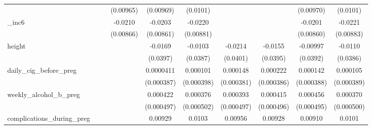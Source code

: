 \begin{table}[htbp]
\begin{tabular}{l*{9}{c}}
            &                     &                     &   (0.00965)         &   (0.00969)         &    (0.0101)         &                     &                     &   (0.00970)         &    (0.0101)         \\
[1em]
\_inc6       &                     &                     &     -0.0210\sym{**} &     -0.0203\sym{**} &     -0.0220\sym{**} &                     &                     &     -0.0201\sym{**} &     -0.0221\sym{**} \\
            &                     &                     &   (0.00866)         &   (0.00861)         &   (0.00881)         &                     &                     &   (0.00860)         &   (0.00883)         \\
[1em]
height      &                     &                     &                     &     -0.0169         &     -0.0103         &     -0.0214         &     -0.0155         &    -0.00997         &     -0.0110         \\
            &                     &                     &                     &    (0.0397)         &    (0.0387)         &    (0.0401)         &    (0.0395)         &    (0.0392)         &    (0.0386)         \\
[1em]
daily\_cig\_before\_preg&                     &                     &                     &   0.0000411         &    0.000101         &    0.000148         &    0.000222         &    0.000142         &    0.000105         \\
            &                     &                     &                     &  (0.000387)         &  (0.000398)         &  (0.000381)         &  (0.000386)         &  (0.000388)         &  (0.000389)         \\
[1em]
weekly\_alcohol\_b\_preg&                     &                     &                     &    0.000422         &    0.000376         &    0.000393         &    0.000415         &    0.000456         &    0.000370         \\
            &                     &                     &                     &  (0.000497)         &  (0.000502)         &  (0.000497)         &  (0.000496)         &  (0.000495)         &  (0.000500)         \\
[1em]
complications\_during\_preg&                     &                     &                     &     0.00929         &      0.0103         &     0.00956         &     0.00928         &     0.00910         &      0.0101         \\

\end{tabular}
\end{table}
